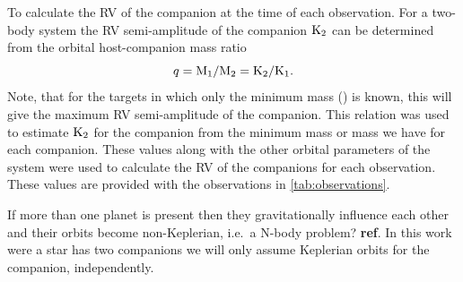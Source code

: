 To calculate the {RV} of the companion at the time of each observation.
For a two-body system the {RV} semi-amplitude of the companion \(\textrm{K}_{2}\) can be determined from the orbital host-companion mass ratio
\begin{equation}
q = \textrm{M}_{1}/\textrm{M}_{2} = \textrm{K}_{2}/\textrm{K}_{1}\label{eqn:q_ratio_K2}.
\end{equation}
Note, that for the targets in which only the minimum mass (\Mtwosini) is known, this will give the maximum {RV} semi-amplitude of the companion.
This relation was used to estimate \(\textrm{K}_{2}\) for the companion from the minimum mass or mass we have for each companion.
These values along with the other orbital parameters of the system were used to calculate the {RV} of the companions for each observation.
These values are provided with the observations in \cref{tab:observations}.




If more than one planet is present then they gravitationally influence each other and their orbits become non-Keplerian, i.e.\ a N-body problem? {\textbf{ref}}.
In this work were a star has two companions we will only assume Keplerian orbits for the companion, independently.
